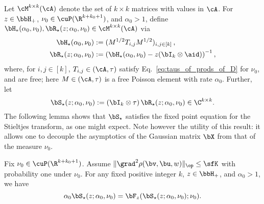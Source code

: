 Let $\cM^{k\times k}(\cA)$ denote the set of $k\times k$ matrices with values in $\cA$.
For $z\in\bbH_+$, $\nu_0\in\cuP(\R^{k+k_0+1})$, and $\alpha_0 >1$, define 
$\bH_{*}(\alpha_0,\nu_0),\bR_\star(z; \alpha_0, \nu_0) \in 
\cM^{k\times k}(\cA)$ via
\begin{align}
\label{eq:def_H_star}
\bH_\star(\alpha_0, \nu_0) &:= (M^{1/2}T_{i,j} M^{1/2})_{i,j\in[k]} \, ,\\
   \bR_\star(z; \alpha_0, \nu_0) &:= \left(
   \bH_\star(\alpha_0, \nu_0)- z (\bI_k \otimes \aid )\right)^{-1} ,
\end{align}
where, for $i,j\in[k]$, $T_{i,j}\in(\cA,\tau)$ satisfy Eq.~\eqref{eq:taus_of_prods_of_D} for $\nu_0$, 
and are free; here $M \in(\cA,\tau)$ is
a free Poisson element with rate $\alpha_0$. 
Further, let
\begin{equation}
\label{eq:def_S_star}
    \bS_\star(z; \alpha_0, \nu_0) := \left(\bI_k \otimes \tau\right) \bR_\star(z; \alpha_0, \nu_0) \in\C^{k\times k}.
\end{equation}
The following lemma shows that $\bS_\star$ satisfies 
the fixed point equation for the Stieltjes transform, as one might expect. Note however the utility of this result: it allows one to decouple the asymptotics of the Gaussian matrix $\bX$ from that of the measure $\nu_0.$
%
\begin{lemma}
\label{lemma:asymp_ST}
Fix $\nu_0\in\cuP(\R^{k+k_0+1})$.
Assume $\|\grad^2 \rho(\bv,\bu,w)\|_{\op}\le \sfK$ with 
probability one under $\nu_0$.
For any fixed positive integer $k$, $z\in \bbH_+$,  
and $\alpha_0 >1$, we have
    \begin{equation}
        \alpha_0 \bS_\star(z; \alpha_0, \nu_0) = 
        \bF_z(\bS_\star(z; \alpha_0, \nu_0);\nu_0).
    \end{equation}
\end{lemma}
